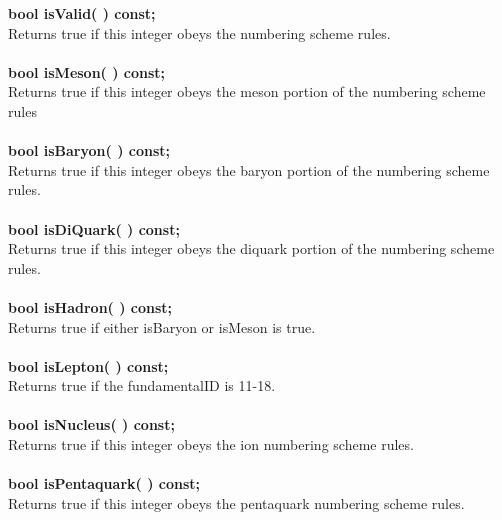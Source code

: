 \documentclass[twoside,12pt]{article}
\begin{document}
\begin{tabbing}
\hspace{0.5in}  {\bf bool isValid( )   const; }\\
\hspace{0.5in}  Returns true if this integer obeys the numbering scheme rules. \\ \\
\hspace{0.5in}  {\bf bool isMeson( )   const; }\\
\hspace{0.5in}  Returns true if this integer obeys the meson  portion of the numbering scheme rules\\ \\
\hspace{0.5in}  {\bf bool isBaryon( )  const; }\\
\hspace{0.5in}  Returns true if this integer obeys the baryon portion of the numbering scheme rules.\\ \\
\hspace{0.5in}  {\bf bool isDiQuark( ) const; }\\
\hspace{0.5in}  Returns true if this integer obeys the diquark portion of the numbering scheme rules.\\ \\
\hspace{0.5in}  {\bf bool isHadron( )  const; }\\
\hspace{0.5in}  Returns true if either isBaryon or isMeson is true. \\ \\
\hspace{0.5in}  {\bf bool isLepton( )  const; }\\
\hspace{0.5in}  Returns true if the fundamentalID is 11-18. \\ \\
\hspace{0.5in}  {\bf bool isNucleus( )  const; }\\
\hspace{0.5in}  Returns true if this integer obeys the ion numbering scheme rules. \\ \\
\hspace{0.5in}  {\bf bool isPentaquark( )  const; }\\
\hspace{0.5in}  Returns true if this integer obeys the pentaquark numbering scheme rules. \\ \\


\end{tabbing}
\end{document}

